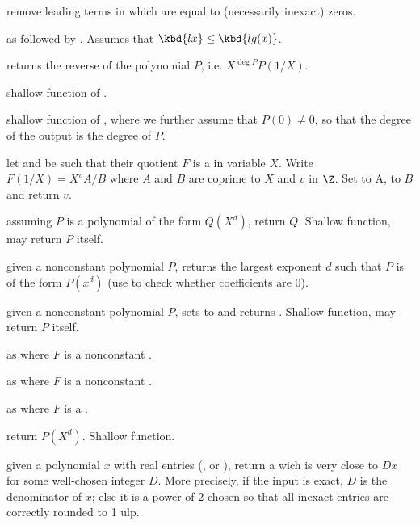  remove leading terms in  which are
equal to (necessarily inexact) zeros.

 as 
followed by . Assumes that $\kbd{lx} \leq
\kbd{lg(x)}$.

 returns the reverse of the polynomial
$P$, i.e. $X^{\deg P} P(1/X)$.

 shallow function of .

 shallow function of ,
where we further assume that $P(0)\neq 0$, so that the degree of the output
is the degree of $P$.

 let  and  be such that
their quotient $F$ is a  in variable $X$. Write $F(1/X) = X^v A/B$
where $A$ and $B$ are coprime to $X$ and $v$ in $\Z$. Set  to A,
 to $B$ and return $v$.

 assuming $P$ is a polynomial of the
form $Q(X^d)$, return $Q$. Shallow function, may return $P$ itself.

 given a nonconstant polynomial
$P$, returns the largest exponent $d$ such that $P$ is of the form $P(x^d)$
(use  to check whether coefficients are 0).

 given a nonconstant polynomial
$P$, sets  to  and
returns . Shallow function, may return $P$ itself.

as  where $F$ is a nonconstant .

as  where $F$ is a nonconstant .

as  where $F$ is a .

 return $P(X^d)$. Shallow function.

 given a polynomial $x$ with real entries
(,  or ), return a  wich is very close
to $D x$ for some well-chosen integer $D$. More precisely, if the input is
exact, $D$ is the denominator of $x$; else it is a power of $2$ chosen
so that all inexact entries are correctly rounded to 1 ulp.

